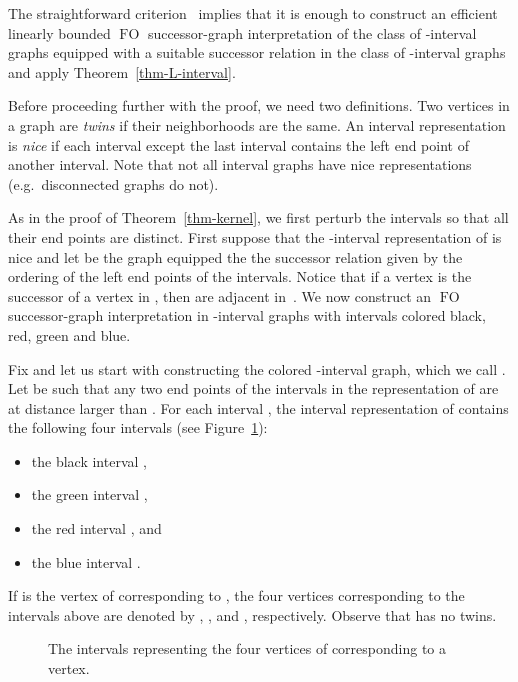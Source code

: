 \documentclass{CSML}
\newcommand{\FO}{\ensuremath{\operatorname{FO}}\xspace}
\theoremstyle{plain}\newtheorem{claim}[thm]{Claim}
\begin{document}
\proof
The straightforward criterion~\cite[Lemma~5.3]{EKS12} implies that
it is enough to construct an efficient linearly bounded \FO successor-graph
interpretation of the class of -interval graphs equipped with a suitable
successor relation in the class of -interval graphs and apply Theorem~\ref{thm-L-interval}.

Before proceeding further with the proof, we need two definitions.
Two vertices in a graph are {\em twins} if their neighborhoods are the same.
An interval representation is {\em nice} if each interval except the last interval contains the left end point of another interval.
Note that not all interval graphs have nice representations (e.g.~disconnected graphs do not).

As in the proof of Theorem~\ref{thm-kernel}, we first perturb the intervals so that all their end points are distinct.
First suppose that the -interval representation of  is nice and
let  be the graph  equipped the the successor relation given by 
the ordering of the left end points of the intervals.
Notice that if a vertex  is the successor of a vertex  in , then
 are adjacent in~.
We now construct an \FO successor-graph interpretation  in -interval graphs with intervals colored black, red, green and blue.

Fix  and let us start with constructing the colored -interval graph, which we call .
Let  be such that any two end points of the intervals
in the representation of  are at distance larger than .
For each interval , the interval representation of  contains the following four intervals (see Figure~\ref{fig:colorful}):
\begin{itemize}
\item the black interval ,
\item the green interval ,
\item the red interval , and
\item the blue interval .
\end{itemize}
If  is the vertex of  corresponding to , the four vertices corresponding to the intervals above
are denoted by , ,  and , respectively. Observe that  has no twins.

\begin{figure}[!htbp]
  \centering

  
  \caption{The intervals representing the four vertices of  corresponding to a vertex.}
  \label{fig:colorful}
\end{figure}
\end{document}
